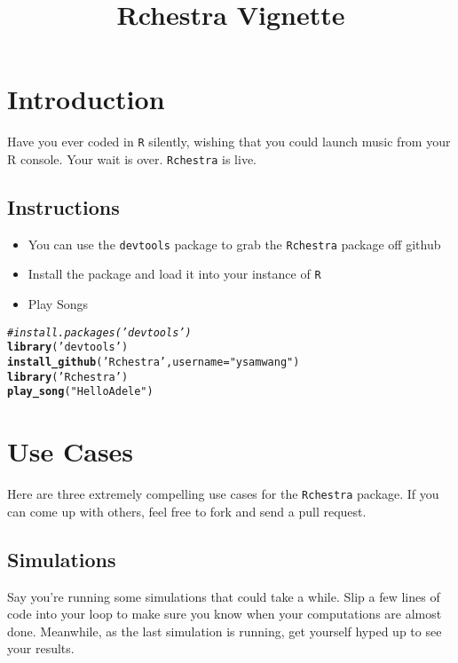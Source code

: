 \documentclass{article}\usepackage[]{graphicx}\usepackage[]{color}
\title{Rchestra Vignette}
\makeatletter
\newcommand{\hlstr}[1]{\textcolor[rgb]{0.192,0.494,0.8}{#1}}%
\newcommand{\hlcom}[1]{\textcolor[rgb]{0.678,0.584,0.686}{\textit{#1}}}%
\newcommand{\hlstd}[1]{\textcolor[rgb]{0.345,0.345,0.345}{#1}}%
\newcommand{\hlkwc}[1]{\textcolor[rgb]{0.333,0.667,0.333}{#1}}%
\newcommand{\hlkwd}[1]{\textcolor[rgb]{0.737,0.353,0.396}{\textbf{#1}}}%
\newenvironment{kframe}{%
 \def\at@end@of@kframe{}%
 \ifinner\ifhmode%
  \def\at@end@of@kframe{\end{minipage}}%
  \begin{minipage}{\columnwidth}%
 \fi\fi%
 \def\FrameCommand##1{\hskip\@totalleftmargin \hskip-\fboxsep
 \colorbox{shadecolor}{##1}\hskip-\fboxsep
     \hskip-\linewidth \hskip-\@totalleftmargin \hskip\columnwidth}%
 \MakeFramed {\advance\hsize-\width
   \@totalleftmargin\z@ \linewidth\hsize
   \@setminipage}}%
 {\par\unskip\endMakeFramed%
 \at@end@of@kframe}
\newenvironment{knitrout}{}{} %
\makeatother
\begin{document}
\maketitle
\section{Introduction}
Have you ever coded in \texttt{R} silently, wishing that you could launch music from your R console. Your wait is over. \texttt{Rchestra} is live.

\subsection{Instructions}
\begin{itemize}
\item You can use the \texttt{devtools} package to grab the \texttt{Rchestra} package off github
\item Install the package and load it into your instance of \texttt{R}
\item Play Songs
\end{itemize}
\begin{knitrout}
\color{fgcolor}\begin{kframe}
\begin{alltt}
\hlcom{# install.packages('devtools')}
\hlkwd{library}\hlstd{(}\hlstr{'devtools'}\hlstd{)}
\hlkwd{install_github}\hlstd{(}\hlstr{'Rchestra'}\hlstd{,} \hlkwc{username} \hlstd{=} \hlstr{"ysamwang"}\hlstd{)}
\hlkwd{library}\hlstd{(}\hlstr{'Rchestra'}\hlstd{)}
\hlkwd{play_song}\hlstd{(}\hlstr{"Hello Adele"}\hlstd{)}
\end{alltt}
\end{kframe}
\end{knitrout}

\section{Use Cases}
Here are three extremely compelling use cases for the \texttt{Rchestra} package. If you can come up with others, feel free to fork and send a pull request.

\subsection{Simulations}
Say you're running some simulations that could take a while. Slip a few lines of code into your loop to make sure you know when your computations are almost done. Meanwhile, as the last simulation is running, get yourself hyped up to see your results.
\end{document}
